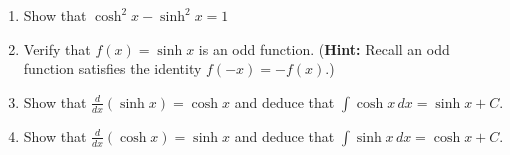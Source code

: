\documentclass[12pt]{article}
\newif\ifans
\begin{document}
\begin{enumerate}
\begin{enumerate}
\item Show that $\cosh^2{x}-\sinh^2{x}=1$

\ifans{\fbox{\parbox{1\linewidth}{
\begin{align*}
\cosh^2{x}-\sinh^{2}{x} & = (\cosh{x}+\sinh{x})(\cosh{x}-\sinh{x})\\
&=\left(\frac{e^x+e^{-x}}{2}+\frac{e^x-e^{-x}}{2}\right)\left(\frac{e^x+e^{-x}}{2}-\frac{e^x-e^{-x}}{2}\right)\\
&=(e^x)(e^{-x})\\
&=1
\end{align*}
}}} \fi

\item Verify that $f(x)=\sinh{x}$ is an odd function. ({\bf Hint:} Recall an odd function satisfies the identity $f(-x)=-f(x)$.)

\ifans{\fbox{\parbox{1\linewidth}{To verify that a function is off, we check that $f(-x)=-f(x)$. We compute by appealing to the definition of $\sinh{x}$ from above.
\begin{align*}
\sinh{(-x)}&=\frac{e^{-x}-e^{-(-x)}}{2}\\
&=\frac{e^{-x}-e^{x}}{2}\\
&=-\left(\frac{e^{x}-e^{-x}}{2}\right)\\
&=-\sinh{x}
\end{align*}
Thus, $f(x)=\sinh{x}$ is odd.}}} \fi

\newpage

\item Show that $\frac{d}{dx}(\sinh{x})=\cosh{x}$ and deduce that $\int \cosh{x}\,dx=\sinh{x}+C$.

\ifans{\fbox{\parbox{1\linewidth}{
\begin{align*}
\frac{d}{dx}(\sinh{x}) &= \frac{d}{dx}\left(\frac{e^x-e^{-x}}{2}\right)\\
&=\frac{d}{dx}\left(\frac{1}{2}e^x-\frac{1}{2}e^{-x}\right)\\
&=\frac{1}{2}e^x+\frac{1}{2}e^{-x}\\
&=\frac{e^x+e^{-x}}{2}\\
&=\cosh{x}
\end{align*}
Thus, as a result, $\int \cosh{x}\,dx=\sinh{x}+C$.  (We could have also verified this integration formula by integrating the given definition of $\cosh{x}$.)
}}} \fi

\item Show that $\frac{d}{dx}(\cosh{x})=\sinh{x}$ and deduce that $\int \sinh{x}\,dx=\cosh{x}+C$.

\ifans{\fbox{\parbox{1\linewidth}{
\begin{align*}
\frac{d}{dx}(\cosh{x}) &= \frac{d}{dx}\left(\frac{e^x+e^{-x}}{2}\right)\\
&=\frac{d}{dx}\left(\frac{1}{2}e^x+\frac{1}{2}e^{-x}\right)\\
&=\frac{1}{2}e^x-\frac{1}{2}e^{-x}\\
&=\frac{e^x-e^{-x}}{2}\\
&=\sinh{x}
\end{align*}
Thus, as a result, $\int \sinh{x}\,dx=\cosh{x}+C$.  (We could have also verified this integration formula by integrating the given definition of $\sinh{x}$.)
}}} \fi


\end{enumerate}
\end{enumerate}
\end{document}
